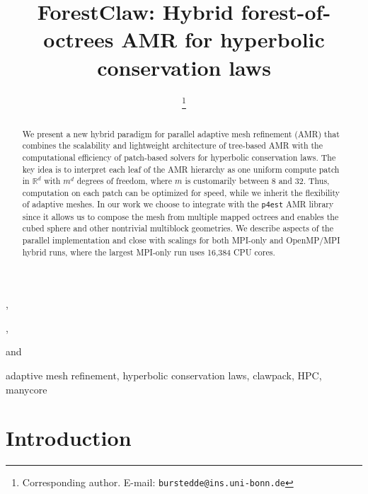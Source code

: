 \documentclass{IOS-Book-Article}     %
\newcommand{\sR}{\mathbb{R}}
\newcommand{\forestclaw}{ForestClaw\xspace}
\newcommand{\pforest}{\texttt{p4est}\xspace}
\begin{document}
\begin{frontmatter}          %
%
\title{\forestclaw:
        Hybrid forest-of-octrees AMR for hyperbolic conservation laws}
\runningtitle{\forestclaw}

%
\author[A]{ %
\thanks{Corresponding author.  E-mail: \texttt{burstedde@ins.uni-bonn.de}}},
\author[B]{ },
\author[C]{ } and
\author[C]{ }
\address[A]{Institut f\"ur Numerische Simulation, Universit\"at Bonn, Germany}
\address[B]{Boise State University, Idaho, USA}
\address[C]{Institute for Computational Engineering and Sciences,\\
The University of Texas at Austin, USA}

\begin{abstract}
We present a new hybrid paradigm for parallel adaptive mesh refinement (AMR)
that combines the scalability and lightweight architecture of tree-based AMR
with the computational efficiency of patch-based solvers for hyperbolic
conservation laws.  The key idea is to interpret each leaf of the AMR hierarchy
as one uniform compute patch in $\sR^d$ with $m^d$ degrees of freedom, where $m$ is
customarily between 8 and 32.  Thus, computation on each patch can be optimized
for speed, while we inherit the flexibility of adaptive meshes.  In our work we
choose to integrate with the \pforest AMR library since it allows us to compose
the mesh from multiple mapped octrees and enables the cubed sphere and other
nontrivial multiblock geometries.  We describe aspects of the parallel
implementation and close with scalings for both MPI-only and OpenMP/MPI hybrid
runs, where the largest MPI-only run uses 16,384 CPU cores.
\end{abstract}

\begin{keyword}
adaptive mesh refinement,
hyperbolic conservation laws,
clawpack,
HPC,
manycore
\end{keyword}

\end{frontmatter}


\section{Introduction}
\end{document}

